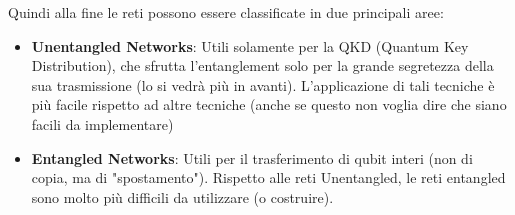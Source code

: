 Quindi alla fine le reti possono essere classificate in due principali aree:
\begin{itemize}
    \item \textbf{Unentangled Networks}: Utili solamente per la QKD (Quantum Key Distribution), che sfrutta l'entanglement solo per la grande segretezza della sua trasmissione (lo si vedrà più in avanti). L'applicazione di tali tecniche è più facile rispetto ad altre tecniche (anche se questo non voglia dire che siano facili da implementare)
    
    \item \textbf{Entangled Networks}: Utili per il trasferimento di qubit interi (non di copia, ma di "spostamento"). Rispetto alle reti Unentangled, le reti entangled sono molto più difficili da utilizzare (o costruire).
    
\end{itemize}